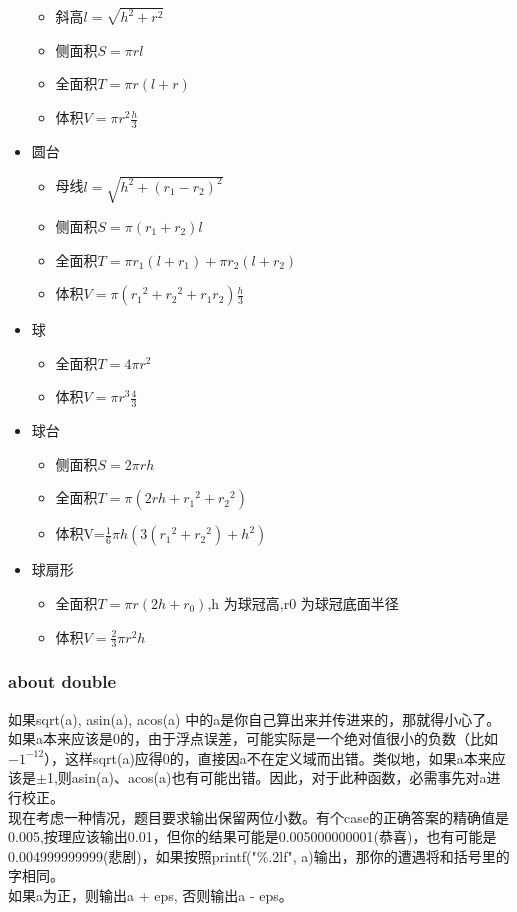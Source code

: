\begin{itemize}
\begin{itemize}
\item 斜高$l=\sqrt{h^2+r^2}$
\item 侧面积$S=\pi rl$
\item 全面积$T=\pi r(l+r)$
\item 体积$V=\pi r^2\frac{h}{3}$
\end{itemize}
\item 圆台
\begin{itemize}
\item 母线$l=\sqrt{h^2+(r_1-r_2)^2}$
\item 侧面积$S=\pi(r_1+r_2)l$
\item 全面积$T=\pi r_1(l+r_1)+\pi r_2(l+r_2)$
\item 体积$V=\pi({r_1}^2+{r_2}^2+{r_1}{r_2})\frac{h}{3}$
\end{itemize}
\item 球
\begin{itemize}
\item 全面积$T=4\pi r^2$
\item 体积$V=\pi r^3\frac{4}{3}$
\end{itemize}
\item 球台
\begin{itemize}
\item 侧面积$S=2\pi rh$
\item 全面积$T=\pi(2rh+{r_1}^2+{r_2}^2)$
\item 体积V=$\frac{1}{6}\pi h(3({r_1}^2+{r_2}^2)+h^2)$
\end{itemize}
\item 球扇形
\begin{itemize}
\item 全面积$T=\pi r(2h+r_0)$,h 为球冠高,r0 为球冠底面半径
\item 体积$V=\frac{2}{3}\pi r^2h$
\end{itemize}
\end{itemize}

\subsubsection{about double}

如果sqrt(a), asin(a), acos(a) 中的a是你自己算出来并传进来的，那就得小心了。如果a本来应该是0的，由于浮点误差，可能实际是一个绝对值很小的负数（比如$-1^{-12}$），这样sqrt(a)应得0的，直接因a不在定义域而出错。类似地，如果a本来应该是$\pm$1,则asin(a)、acos(a)也有可能出错。因此，对于此种函数，必需事先对a进行校正。\\

现在考虑一种情况，题目要求输出保留两位小数。有个case的正确答案的精确值是0.005,按理应该输出0.01，但你的结果可能是0.005000000001(恭喜)，也有可能是0.004999999999(悲剧)，如果按照printf("\%.2lf", a)输出，那你的遭遇将和括号里的字相同。\\
如果a为正，则输出a + eps, 否则输出a - eps。\\

